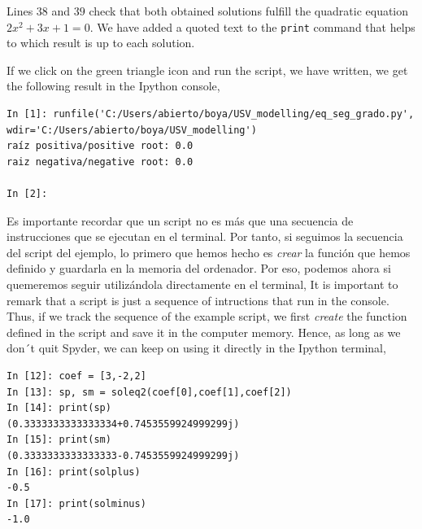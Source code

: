 \begin{paracol}{2}
     Lines $38$ and $39$ check that both obtained solutions fulfill the quadratic equation $2x^2+3x+1 = 0$. We have added a quoted text to the \texttt{print} command that helps to which result is up to each solution.

     If we click on the green triangle icon and run the script, we have written, we get the following result in the Ipython console,
     
\end{paracol}

\begin{verbatim}
In [1]: runfile('C:/Users/abierto/boya/USV_modelling/eq_seg_grado.py',
wdir='C:/Users/abierto/boya/USV_modelling')
raíz positiva/positive root: 0.0
raiz negativa/negative root: 0.0

In [2]:    
\end{verbatim}

\begin{paracol}{2}
Es importante recordar que un script no es más que una secuencia de instrucciones que se ejecutan en el terminal. Por tanto, si seguimos la secuencia del script del ejemplo, lo primero que hemos hecho es \emph{crear} la función que hemos definido y guardarla en la memoria del ordenador. Por eso, podemos ahora si quemeremos seguir utilizándola directamente en el terminal,
\switchcolumn
It is important to remark that a script is just a sequence of intructions that run in the console. Thus, if we track the sequence of the example script, we first \emph{create} the function defined in the script and save it in the computer memory. Hence, as long as we don´t quit Spyder,  we can keep on using it directly in the Ipython terminal,  
\end{paracol}

\begin{verbatim}
In [12]: coef = [3,-2,2]
In [13]: sp, sm = soleq2(coef[0],coef[1],coef[2])
In [14]: print(sp)
(0.3333333333333334+0.7453559924999299j)
In [15]: print(sm)
(0.3333333333333333-0.7453559924999299j)
In [16]: print(solplus)
-0.5
In [17]: print(solminus)
-1.0   
\end{verbatim}

